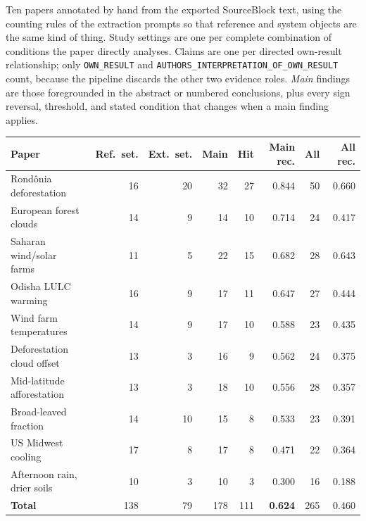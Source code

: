 Ten papers annotated by hand from the exported SourceBlock text, using the counting
rules of the extraction prompts so that reference and system objects are the same kind
of thing. Study settings are one per complete combination of conditions the paper
directly analyses. Claims are one per directed own-result relationship; only
\texttt{OWN\_RESULT} and \texttt{AUTHORS\_INTERPRETATION\_OF\_OWN\_RESULT} count,
because the pipeline discards the other two evidence roles. \emph{Main} findings are
those foregrounded in the abstract or numbered conclusions, plus every sign reversal,
threshold, and stated condition that changes when a main finding applies.

\begin{table}[h]
\centering
\small
\begin{tabular}{@{}lrrrrrrr@{}}
\toprule
\textbf{Paper} & \textbf{Ref.\ set.} & \textbf{Ext.\ set.} & \textbf{Main} & \textbf{Hit} & \textbf{Main rec.} & \textbf{All} & \textbf{All rec.} \\
\midrule
Rond\^onia deforestation~\citep{wang1999amazonia} & 16 & 20 & 32 & 27 & 0.844 & 50 & 0.660 \\
European forest clouds~\citep{teuling2017cloud} & 14 & 9 & 14 & 10 & 0.714 & 24 & 0.417 \\
Saharan wind/solar farms~\citep{li2018sahara} & 11 & 5 & 22 & 15 & 0.682 & 28 & 0.643 \\
Odisha LULC warming~\citep{gogoi2019odisha} & 16 & 9 & 17 & 11 & 0.647 & 27 & 0.444 \\
Wind farm temperatures~\citep{roy2010impacts} & 14 & 9 & 17 & 10 & 0.588 & 23 & 0.435 \\
Deforestation cloud offset~\citep{luo2024decreased} & 13 & 3 & 16 & 9 & 0.562 & 24 & 0.375 \\
Mid-latitude afforestation~\citep{swann2012midlatitude} & 13 & 3 & 18 & 10 & 0.556 & 28 & 0.357 \\
Broad-leaved fraction~\citep{schwaab2020broadleaved} & 14 & 10 & 15 & 8 & 0.533 & 23 & 0.391 \\
US Midwest cooling~\citep{mueller2016cooling} & 17 & 8 & 17 & 8 & 0.471 & 22 & 0.364 \\
Afternoon rain, drier soils~\citep{taylor2012afternoon} & 10 & 3 & 10 & 3 & 0.300 & 16 & 0.188 \\
\midrule
\textbf{Total} & 138 & 79 & 178 & 111 & \textbf{0.624} & 265 & 0.460 \\
\bottomrule
\end{tabular}
\end{table}

